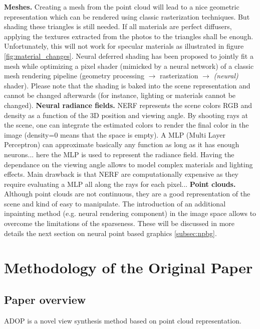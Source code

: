 \noindent\textbf{Meshes.} Creating a mesh from the point cloud will lead to a nice geometric representation which can be rendered using classic rasterization techniques. But shading these triangles is still needed. If all materials are perfect diffusers, applying the textures extracted from the photos to the triangles shall be enough. Unfortunately, this will not work for specular materials as illustrated in figure \ref{fig:material_changes}. Neural deferred shading has been proposed \cite{worchel2022nds} to jointly fit a mesh while optimizing a pixel shader (mimicked by a neural network) of a classic mesh rendering pipeline (geometry processing $\rightarrow$ rasterization $\rightarrow$ \textit{(neural)} shader). Please note that the shading is baked into the scene representation and cannot be changed afterwards (for instance, lighting or materials cannot be changed).
\noindent\textbf{Neural radiance fields.} NERF \cite{mildenhall2020nerf} represents the scene colors RGB and density as a function of the 3D position and viewing angle. By shooting rays at the scene, one can integrate the estimated colors to render the final color in the image (density=0 means that the space is empty). A MLP (Multi Layer Perceptron) can approximate basically any function as long as it has enough neurons... here the MLP is used to represent the radiance field. Having the dependance on the viewing angle allows to model complex materials and lighting effects. Main drawback is that NERF are computationally expensive as they require evaluating a MLP all along the rays for each pixel...
\noindent\textbf{Point clouds.} Although point clouds are not continuous, they are a good representation of the scene and kind of easy to manipulate. The introduction of an additional inpainting method (e.g. neural rendering component) in the image space allows to overcome the limitations of the sparseness. These will be discussed in more details the next section on neural point based graphics \ref{subsec:npbg}.



\section{Methodology of the Original Paper}
\label{sec:methodology_paper}

\subsection{Paper overview}
\label{subsec:paper_overview}
ADOP \cite{ruckert2022adop} is a novel view synthesis method based on point cloud representation. 

